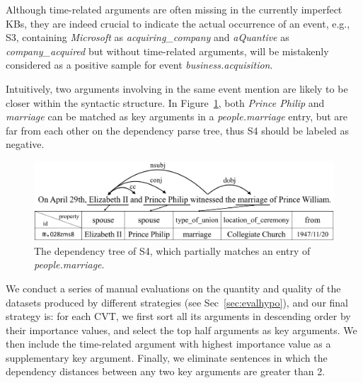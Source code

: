 Although time-related arguments are often missing in the currently imperfect KBs,
they are indeed crucial to indicate the actual occurrence of an event, e.g., S3, containing \emph{Microsoft} as \emph{acquiring\_company} and \emph{aQuantive} as \emph{company\_acquired} but without time-related arguments, will be mistakenly considered as a positive sample for event \emph{business.acquisition}.

Intuitively, two arguments involving in the same event mention are likely to be closer within the syntactic structure.
In Figure~\ref{fig:2}, both \emph{Prince Philip} and \emph{marriage} can be matched as key arguments in a \textit{people.marriage} entry, but are far from each other on the dependency parse tree, thus S4 should be labeled as negative.

\begin{figure}
\centering
	\includegraphics[width=.48\textwidth]{figure2.png}
	\caption{The dependency tree of S4, which partially matches an entry of \emph{people.marriage}. \label{fig:2}}
\end{figure}

We conduct a series of manual evaluations on the quantity and quality of the datasets produced by different strategies (see Sec~\ref{sec:evalhypo}), and
our final strategy is:
for each CVT, we first sort all its arguments in descending order by their importance values, and select the top half arguments as key arguments.
We then include the time-related argument with highest importance value as a supplementary key argument.
Finally, we eliminate sentences in which the dependency distances between any two key arguments are greater than 2.

